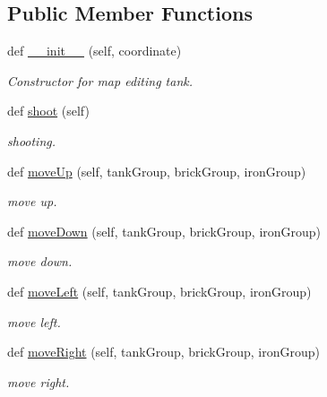 \subsection*{Public Member Functions}
\begin{DoxyCompactItemize}
\item 
def \mbox{\hyperlink{class_map_edit_tank_1_1_map_edit_tank_ad8cc111facbee74fb18dceb311326a41}{\+\_\+\+\_\+init\+\_\+\+\_\+}} (self, coordinate)
\begin{DoxyCompactList}\small\item\em Constructor for map editing tank. \end{DoxyCompactList}\item 
def \mbox{\hyperlink{class_map_edit_tank_1_1_map_edit_tank_a7d9e967d520fd8f5cccf25d6458f9171}{shoot}} (self)
\begin{DoxyCompactList}\small\item\em shooting. \end{DoxyCompactList}\item 
def \mbox{\hyperlink{class_map_edit_tank_1_1_map_edit_tank_af78bf27879a5b2a2c6edc8fe31714b28}{move\+Up}} (self, tank\+Group, brick\+Group, iron\+Group)
\begin{DoxyCompactList}\small\item\em move up. \end{DoxyCompactList}\item 
def \mbox{\hyperlink{class_map_edit_tank_1_1_map_edit_tank_a5777197d894d3766aa2154cfea70aad6}{move\+Down}} (self, tank\+Group, brick\+Group, iron\+Group)
\begin{DoxyCompactList}\small\item\em move down. \end{DoxyCompactList}\item 
def \mbox{\hyperlink{class_map_edit_tank_1_1_map_edit_tank_a738b438a43db803d89e1d42aa980c79b}{move\+Left}} (self, tank\+Group, brick\+Group, iron\+Group)
\begin{DoxyCompactList}\small\item\em move left. \end{DoxyCompactList}\item 
def \mbox{\hyperlink{class_map_edit_tank_1_1_map_edit_tank_a22cba3ac0ac67ea3a779e6490b6575e5}{move\+Right}} (self, tank\+Group, brick\+Group, iron\+Group)
\begin{DoxyCompactList}\small\item\em move right. \end{DoxyCompactList}\end{DoxyCompactItemize}
